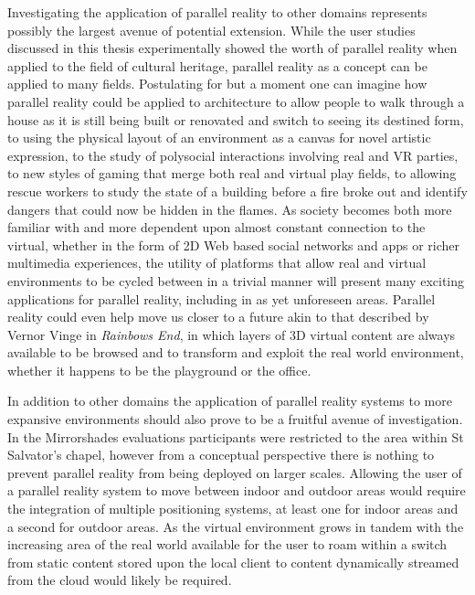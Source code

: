 Investigating the application of parallel reality to other domains represents possibly the largest avenue of potential extension. While the user studies discussed in this thesis experimentally showed the worth of parallel reality when applied to the field of cultural heritage, parallel reality as a concept can be applied to many fields. Postulating for but a moment one can imagine how parallel reality could be applied to architecture to allow people to walk through a house as it is still being built or renovated and switch to seeing its destined form, to using the physical layout of an environment as a canvas for novel artistic expression, to the study of polysocial interactions involving real and VR parties, to new styles of gaming that merge both real and virtual play fields, to allowing rescue workers to study the state of a building before a fire broke out and identify dangers that could now be hidden in the flames. As society becomes both more familiar with and more dependent upon almost constant connection to the virtual, whether in the form of 2D Web based social networks and apps or richer multimedia experiences, the utility of platforms that allow real and virtual environments to be cycled between in a trivial manner will present many exciting applications for parallel reality, including in as yet unforeseen areas. Parallel reality could even help move us closer to a future akin to that described by Vernor Vinge in \textit{Rainbows End}, in which layers of 3D virtual content are always available to be browsed and to transform and exploit the real world environment, whether it happens to be the playground or the office.

In addition to other domains the application of parallel reality systems to more expansive environments should also prove to be a fruitful avenue of investigation. In the Mirrorshades evaluations participants were restricted to the area within St Salvator's chapel, however from a conceptual perspective there is nothing to prevent parallel reality from being deployed on larger scales. Allowing the user of a parallel reality system to move between indoor and outdoor areas would require the integration of multiple positioning systems, at least one for indoor areas and a second for outdoor areas. As the virtual environment grows in tandem with the increasing area of the real world available for the user to roam within a switch from static content stored upon the local client to content dynamically streamed from the cloud would likely be required.

